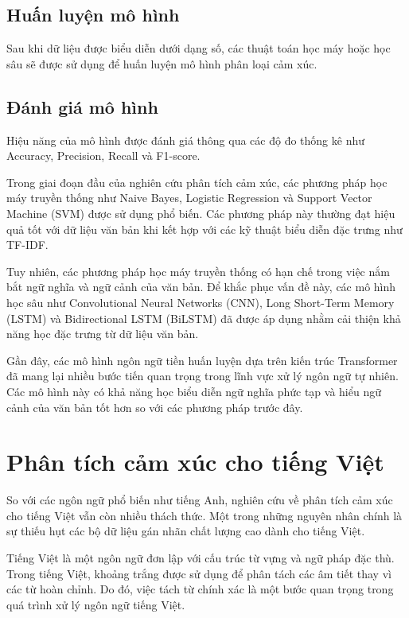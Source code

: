 \documentclass[14pt, a4paper]{report}
\begin{document}
\subsection{Huấn luyện mô hình}

Sau khi dữ liệu được biểu diễn dưới dạng số, các thuật toán học máy hoặc học sâu sẽ được sử dụng để huấn luyện mô hình phân loại cảm xúc.

\subsection{Đánh giá mô hình}

Hiệu năng của mô hình được đánh giá thông qua các độ đo thống kê như Accuracy, Precision, Recall và F1-score.

Trong giai đoạn đầu của nghiên cứu phân tích cảm xúc, các phương pháp học máy truyền thống như Naive Bayes, Logistic Regression và Support Vector Machine (SVM) được sử dụng phổ biến. Các phương pháp này thường đạt hiệu quả tốt với dữ liệu văn bản khi kết hợp với các kỹ thuật biểu diễn đặc trưng như TF-IDF.

Tuy nhiên, các phương pháp học máy truyền thống có hạn chế trong việc nắm bắt ngữ nghĩa và ngữ cảnh của văn bản. Để khắc phục vấn đề này, các mô hình học sâu như Convolutional Neural Networks (CNN), Long Short-Term Memory (LSTM) và Bidirectional LSTM (BiLSTM) đã được áp dụng nhằm cải thiện khả năng học đặc trưng từ dữ liệu văn bản.

Gần đây, các mô hình ngôn ngữ tiền huấn luyện dựa trên kiến trúc Transformer đã mang lại nhiều bước tiến quan trọng trong lĩnh vực xử lý ngôn ngữ tự nhiên. Các mô hình này có khả năng học biểu diễn ngữ nghĩa phức tạp và hiểu ngữ cảnh của văn bản tốt hơn so với các phương pháp trước đây.

\section{Phân tích cảm xúc cho tiếng Việt}

So với các ngôn ngữ phổ biến như tiếng Anh, nghiên cứu về phân tích cảm xúc cho tiếng Việt vẫn còn nhiều thách thức. Một trong những nguyên nhân chính là sự thiếu hụt các bộ dữ liệu gán nhãn chất lượng cao dành cho tiếng Việt.

Tiếng Việt là một ngôn ngữ đơn lập với cấu trúc từ vựng và ngữ pháp đặc thù. Trong tiếng Việt, khoảng trắng được sử dụng để phân tách các âm tiết thay vì các từ hoàn chỉnh. Do đó, việc tách từ chính xác là một bước quan trọng trong quá trình xử lý ngôn ngữ tiếng Việt.
\end{document}
